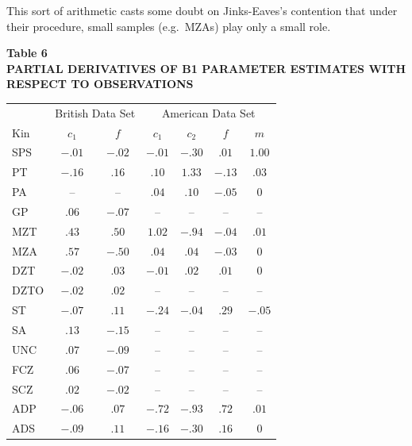 ﻿\documentclass[12pt]{article}
\begin{document}
This sort of arithmetic casts some doubt on Jinks-Eaves's contention that under their procedure, small samples (e.g.\ MZAs) play only a small role.

\begin{center}
\textbf{Table 6}\\
\textbf{PARTIAL DERIVATIVES OF B1 PARAMETER ESTIMATES WITH RESPECT TO OBSERVATIONS}
\end{center}
\begin{center}
\small
\begin{tabular}{l c c c c c c}
\hline
& \multicolumn{2}{c}{British Data Set} & \multicolumn{4}{c}{American Data Set} \\
Kin & $c_1$ & $f$ & $c_1$ & $c_2$ & $f$ & $m$ \\
\hline
SPS & $-.01$ & $-.02$ & $-.01$ & $-.30$ & $.01$ & $1.00$ \\
PT & $-.16$ & $.16$ & $.10$ & $1.33$ & $-.13$ & $.03$ \\
PA & -- & -- & $.04$ & $.10$ & $-.05$ & $0$ \\
GP & $.06$ & $-.07$ & -- & -- & -- & -- \\
MZT & $.43$ & $.50$ & $1.02$ & $-.94$ & $-.04$ & $.01$ \\
MZA & $.57$ & $-.50$ & $.04$ & $.04$ & $-.03$ & $0$ \\
DZT & $-.02$ & $.03$ & $-.01$ & $.02$ & $.01$ & $0$ \\
DZTO & $-.02$ & $.02$ & -- & -- & -- & -- \\
ST & $-.07$ & $.11$ & $-.24$ & $-.04$ & $.29$ & $-.05$ \\
SA & $.13$ & $-.15$ & -- & -- & -- & -- \\
UNC & $.07$ & $-.09$ & -- & -- & -- & -- \\
FCZ & $.06$ & $-.07$ & -- & -- & -- & -- \\
SCZ & $.02$ & $-.02$ & -- & -- & -- & -- \\
ADP & $-.06$ & $.07$ & $-.72$ & $-.93$ & $.72$ & $.01$ \\
ADS & $-.09$ & $.11$ & $-.16$ & $-.30$ & $.16$ & $0$ \\
\hline
\end{tabular}
\end{center}
\end{document}

